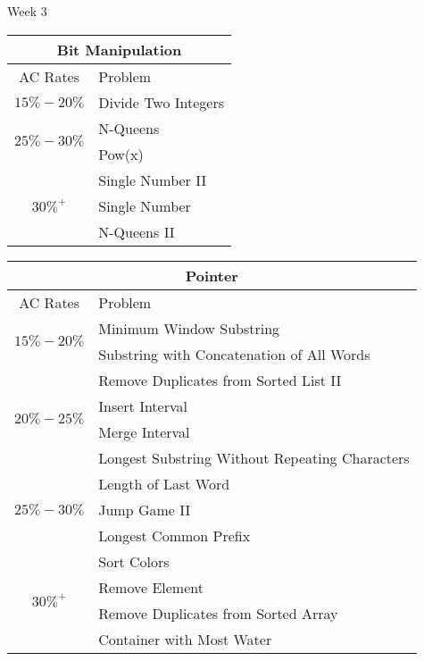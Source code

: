 \documentclass[paper=a4, fontsize=11pt]{scrartcl} %
\begin{document}
\begin{center}
  \pagebreak

  \begin{center}
    Week 3
  \end{center}
  \begin{tabular}{|c|l|}
      \hline
      \multicolumn{2}{|c|}{Bit Manipulation} \\
      \hline
      AC Rates      &   Problem     \\
      \hline
      \multirow{1}{*}{$15\%-20\%$}  &    Divide Two Integers    \\
      \hline
      \multirow{2}{*}{$25\%-30\%$}  &    N-Queens    \\
          & Pow(x)  \\
      \hline
      \multirow{3}{*}{$30\%^+$}  &  Single Number II  \\
          & Single Number \\
          & N-Queens II  \\
      \hline
  \end{tabular}

  \vspace{20mm}
  \begin{tabular}{|c|l|}
      \hline
      \multicolumn{2}{|c|}{Pointer} \\
      \hline
      AC Rates      &   Problem     \\
      \hline
      \multirow{2}{*}{$15\%-20\%$}  &    Minimum Window Substring    \\
          & Substring with Concatenation of All Words \\
      \hline
      \multirow{4}{*}{$20\%-25\%$}  &    Remove Duplicates from Sorted List II    \\
          & Insert Interval \\
          & Merge Interval  \\
          & Longest Substring Without Repeating Characters  \\
      \hline
      \multirow{3}{*}{$25\%-30\%$}  &    Length of Last Word    \\
          & Jump Game II  \\
          & Longest Common Prefix \\
      \hline
      \multirow{4}{*}{$30\%^+$}  &  Sort Colors  \\
          & Remove Element \\
          & Remove Duplicates from Sorted Array  \\
          & Container with Most Water \\
      \hline
  \end{tabular}


\end{center}
\end{document}
